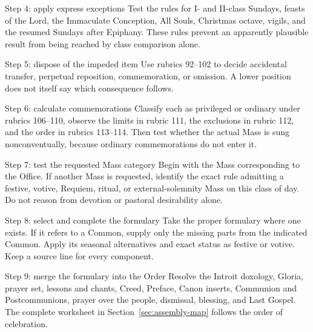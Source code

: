 \begin{massbox}{Step 4: apply express exceptions}
Test the rules for I- and II-class Sundays, feasts of the Lord, the Immaculate Conception, All Souls, Christmas octave, vigils, and the resumed Sundays after Epiphany. These rules prevent an apparently plausible result from being reached by class comparison alone.
\end{massbox}

\begin{massbox}{Step 5: dispose of the impeded item}
Use rubrics 92--102 to decide accidental transfer, perpetual reposition, commemoration, or omission. A lower position does not itself say which consequence follows.
\end{massbox}

\begin{massbox}{Step 6: calculate commemorations}
Classify each as privileged or ordinary under rubrics 106--110, observe the limits in rubric 111, the exclusions in rubric 112, and the order in rubrics 113--114. Then test whether the actual Mass is sung nonconventually, because ordinary commemorations do not enter it.
\end{massbox}

\begin{massbox}{Step 7: test the requested Mass category}
Begin with the Mass corresponding to the Office. If another Mass is requested, identify the exact rule admitting a festive, votive, Requiem, ritual, or external-solemnity Mass on this class of day. Do not reason from devotion or pastoral desirability alone.
\end{massbox}

\begin{massbox}{Step 8: select and complete the formulary}
Take the proper formulary where one exists. If it refers to a Common, supply only the missing parts from the indicated Common. Apply its seasonal alternatives and exact status as festive or votive. Keep a source line for every component.
\end{massbox}

\begin{massbox}{Step 9: merge the formulary into the Order}
Resolve the Introit doxology, Gloria, prayer set, lessons and chants, Creed, Preface, Canon inserts, Communion and Postcommunions, prayer over the people, dismissal, blessing, and Last Gospel. The complete worksheet in Section~\ref{sec:assembly-map} follows the order of celebration.
\end{massbox}


